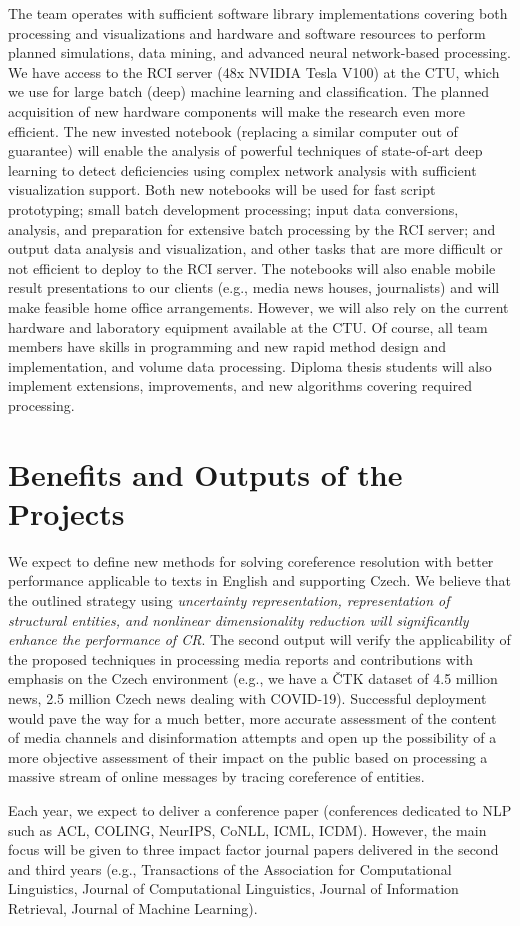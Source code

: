 The team operates with sufficient software library implementations covering both processing and visualizations and hardware and software resources to perform planned simulations, data mining, and advanced neural network-based processing. We have access to the RCI server (48x NVIDIA Tesla V100) at the CTU, which we use for large batch (deep) machine learning and classification. The planned acquisition of new hardware components will make the research even more efficient. The new invested notebook (replacing a similar computer out of guarantee) will enable the analysis of powerful techniques of state-of-art deep learning to detect deficiencies using complex network analysis with sufficient visualization support. Both new notebooks will be used for fast script prototyping; small batch development processing; input data conversions, analysis, and preparation for extensive batch processing by the RCI server; and output data analysis and visualization, and other tasks that are more difficult or not efficient to deploy to the RCI server. The notebooks will also enable mobile result presentations to our clients (e.g., media news houses, journalists) and will make feasible home office arrangements. However, we will also rely on the current hardware and laboratory equipment available at the CTU. Of course, all team members have skills in programming and new rapid method design and implementation, and volume data processing. Diploma thesis students will also implement extensions, improvements, and new algorithms covering required processing.

\section{Benefits and Outputs of the Projects}

We expect to define new methods for solving coreference resolution with better performance applicable to texts in English and supporting Czech. We believe that the outlined strategy using \textit{uncertainty representation, representation of structural entities, and nonlinear dimensionality reduction will significantly enhance the performance of CR}.
The second output will verify the applicability of the proposed techniques in processing media reports and contributions with emphasis on the Czech environment (e.g., we have a ČTK dataset of 4.5 million news, 2.5 million Czech news dealing with COVID-19). Successful deployment would pave the way for a much better, more accurate assessment of the content of media channels and disinformation attempts and open up the possibility of a more objective assessment of their impact on the public based on processing a massive stream of online messages by tracing coreference of entities.

Each year, we expect to deliver a conference paper (conferences dedicated to NLP such as ACL, COLING, NeurIPS, CoNLL, ICML, ICDM). However, the main focus will be given to three impact factor journal papers delivered in the second and third years (e.g., Transactions of the Association for Computational Linguistics, Journal of Computational Linguistics, Journal of Information Retrieval, Journal of Machine Learning).